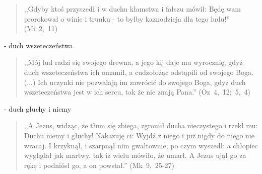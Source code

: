 \documentclass[10pt,a4paper,oneside]{article}
\begin{document}
\begin{quote}
,,Gdyby ktoś przyszedł i w duchu kłamstwa i fałszu mówił: Będę wam prorokował o winie i trunku - to byłby kaznodzieja dla tego ludu!'' \mbox{(Mi 2, 11)}
\end{quote}
- duch wszeteczeństwa
\begin{quote}
,,Mój lud radzi się swojego drewna, a jego kij daje mu wyrocznię, gdyż duch wszeteczeństwa ich omamił, a cudzołożąc odstąpili od swojego Boga. (...) Ich uczynki nie pozwalają im zawrócić do swojego Boga, gdyż duch wszeteczeństwa jest w ich sercu, tak że nie znają Pana.'' \mbox{(Oz 4, 12; 5, 4)}
\end{quote}
- duch głuchy i niemy
\begin{quote}
,,A Jezus, widząc, że tłum się zbiega, zgromił ducha nieczystego i rzekł mu: Duchu niemy i głuchy! Nakazuję ci: Wyjdź z niego i już nigdy do niego nie wracaj. I krzyknął, i szarpnął nim gwałtownie, po czym wyszedł; a chłopiec wyglądał jak martwy, tak iż wielu mówiło, że umarł. A Jezus ujął go za rękę i podniósł go, a on powstał.'' \mbox{(Mk 9, 25-27)}
\end{quote}
\end{document}
